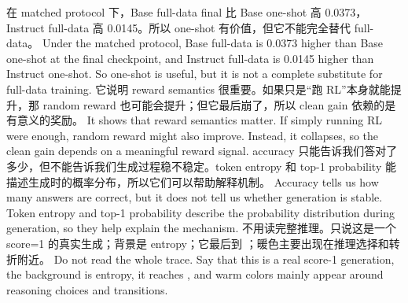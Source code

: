 {}\markdownRendererInterblockSeparator
{}\markdownRendererInterblockSeparator
{}在 matched protocol 下，Base full-data final 比 Base one-shot 高 0.0373，Instruct full-data 高 0.0145。所以 one-shot 有价值，但它不能完全替代 full-data。\markdownRendererInterblockSeparator
{}\markdownRendererInterblockSeparator
{}Under the matched protocol, Base full-data is 0.0373 higher than Base one-shot at the final checkpoint, and Instruct full-data is 0.0145 higher than Instruct one-shot. So one-shot is useful, but it is not a complete substitute for full-data training.\markdownRendererInterblockSeparator
{}\markdownRendererInterblockSeparator
{}\markdownRendererInterblockSeparator
{}它说明 reward semantics 很重要。如果只是“跑 RL”本身就能提升，那 random reward 也可能会提升；但它最后崩了，所以 clean gain 依赖的是有意义的奖励。\markdownRendererInterblockSeparator
{}\markdownRendererInterblockSeparator
{}It shows that reward semantics matter. If simply running RL were enough, random reward might also improve. Instead, it collapses, so the clean gain depends on a meaningful reward signal.\markdownRendererInterblockSeparator
{}\markdownRendererInterblockSeparator
{}\markdownRendererInterblockSeparator
{}accuracy 只能告诉我们答对了多少，但不能告诉我们生成过程稳不稳定。token entropy 和 top-1 probability 能描述生成时的概率分布，所以它们可以帮助解释机制。\markdownRendererInterblockSeparator
{}\markdownRendererInterblockSeparator
{}Accuracy tells us how many answers are correct, but it does not tell us whether generation is stable. Token entropy and top-1 probability describe the probability distribution during generation, so they help explain the mechanism.\markdownRendererInterblockSeparator
{}\markdownRendererInterblockSeparator
{}\markdownRendererInterblockSeparator
{}不用读完整推理。只说这是一个 score=1 的真实生成；背景是 entropy；它最后到 ；暖色主要出现在推理选择和转折附近。\markdownRendererInterblockSeparator
{}\markdownRendererInterblockSeparator
{}Do not read the whole trace. Say that this is a real score-1 generation, the background is entropy, it reaches , and warm colors mainly appear around reasoning choices and transitions.\markdownRendererDocumentEnd